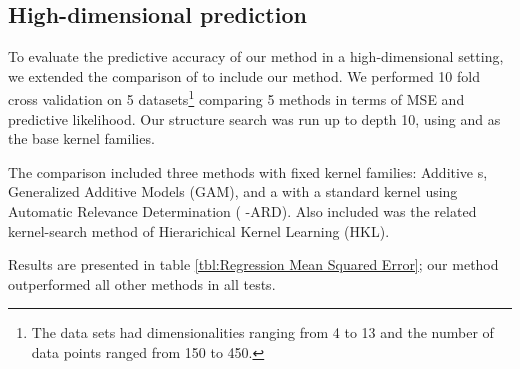 \documentclass[twoside]{article}
\begin{document}
\subsection{High-dimensional prediction}

To evaluate the predictive accuracy of our method in a high-dimensional setting, we extended the comparison of \cite{duvenaud2011additive11} to include our method.
We performed 10 fold cross validation on 5 datasets\footnote{The data sets had dimensionalities ranging from 4 to 13 and the number of data points ranged from 150 to 450.} comparing 5 methods in terms of MSE and predictive likelihood.
Our structure search was run up to depth 10, using \kSE{} and \kRQ{} as the base kernel families.

The comparison included three methods with fixed kernel families: Additive \gp{}s, Generalized Additive Models (GAM), and a \gp{} with a standard \kSE{} kernel using Automatic Relevance Determination (\gp{} \kSE{}-ARD).  Also included was the related kernel-search method of Hierarichical Kernel Learning (HKL).


Results are presented in table \ref{tbl:Regression Mean Squared Error}; our method outperformed all other methods in all tests.

%
%
%

%

%
%
%
%
\end{document}
